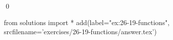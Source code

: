 
\begin{ex}
  \label{ex:26-19-functions}
  
  \qed
\end{ex}
\begin{python0}
from solutions import *
add(label="ex:26-19-functions",
    srcfilename='exercises/26-19-functions/answer.tex')
\end{python0}
